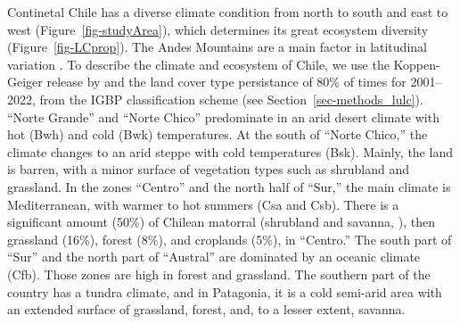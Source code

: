 \documentclass[
  number,
  preprint,
  3p,
  onecolumn]{elsarticle}
\begin{document}
Continetal Chile has a diverse climate condition from north to south and
east to west \citep{Aceituno2021} (Figure~\ref{fig-studyArea}), which
determines its great ecosystem diversity (Figure~\ref{fig-LCprop}). The
Andes Mountains are a main factor in latitudinal variation
\citep{Garreaud2009}. To describe the climate and ecosystem of Chile, we
use the Koppen-Geiger release by \citep{Beck2023} and the land cover
type persistance of 80\% of times for 2001--2022, from the IGBP
classification scheme \citep{Friedl2019} (see
Section~\ref{sec-methods_lulc}). ``Norte Grande'' and ``Norte Chico''
predominate in an arid desert climate with hot (Bwh) and cold (Bwk)
temperatures. At the south of ``Norte Chico,'' the climate changes to an
arid steppe with cold temperatures (Bsk). Mainly, the land is barren,
with a minor surface of vegetation types such as shrubland and
grassland. In the zones ``Centro'' and the north half of ``Sur,'' the
main climate is Mediterranean, with warmer to hot summers (Csa and Csb).
There is a significant amount (50\%) of Chilean matorral (shrubland and
savanna, \citep{Fuentes2021}), then grassland (16\%), forest (8\%), and
croplands (5\%), in ``Centro.'' The south part of ``Sur'' and the north
part of ``Austral'' are dominated by an oceanic climate (Cfb). Those
zones are high in forest and grassland. The southern part of the country
has a tundra climate, and in Patagonia, it is a cold semi-arid area with
an extended surface of grassland, forest, and, to a lesser extent,
savanna.
\end{document}
